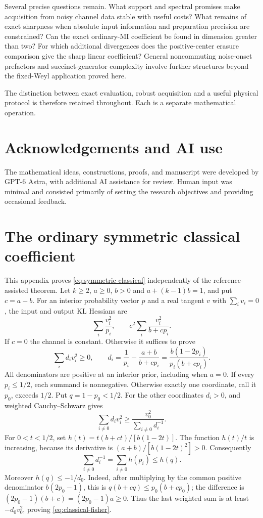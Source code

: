 \documentclass[11pt]{article}
\numberwithin{equation}{section}
\theoremstyle{definition}
\theoremstyle{remark}
\begin{document}
Several precise questions remain. What support and spectral promises
make acquisition from noisy channel data stable with useful costs?
What remains of exact sharpness when absolute input information and
preparation precision are constrained? Can the exact ordinary-MI
coefficient be found in dimension greater than two? For which additional
divergences does the positive-center erasure comparison give the sharp
linear coefficient? General noncommuting noise-onset prefactors and
succinct-generator complexity involve further structures beyond the
fixed-Weyl application proved here.

The distinction between exact evaluation, robust acquisition and a useful
physical protocol is therefore retained throughout. Each is a separate
mathematical operation.

\section*{Acknowledgements and AI use}
The mathematical ideas, constructions, proofs, and manuscript were developed by
GPT-6 Astra, with additional AI assistance for review. Human input was minimal and
consisted primarily of setting the research objectives and providing occasional
feedback.
\appendix
\section{The ordinary symmetric classical coefficient}
\label{app:classical}

This appendix proves \eqref{eq:symmetric-classical} independently of
the reference-assisted theorem. Let $k\geq2$, $a\geq0$, $b>0$ and
$a+(k-1)b=1$, and put $c=a-b$. For an interior probability vector
$p$ and a real tangent $v$ with $\sum_i v_i=0$, the input and output
KL Hessians are
\[
 \sum_i\frac{v_i^2}{p_i},\qquad
 c^2\sum_i\frac{v_i^2}{b+cp_i}.
\]
If $c=0$ the channel is constant. Otherwise it suffices to prove
\begin{equation}
 \sum_i d_i v_i^2\geq0,\qquad
 d_i=\frac1{p_i}-\frac{a+b}{b+cp_i}
     =\frac{b(1-2p_i)}{p_i(b+cp_i)}.
 \label{eq:classical-fisher}
\end{equation}
All denominators are positive at an interior prior, including when $a=0$.
If every $p_i\leq1/2$, each summand is nonnegative.
Otherwise exactly one coordinate, call it $p_0$, exceeds $1/2$.
Put $q=1-p_0<1/2$. For the other coordinates $d_i>0$, and weighted
Cauchy--Schwarz gives
\[
 \sum_{i\ne0}d_i v_i^2
 \geq \frac{v_0^2}{\sum_{i\ne0}d_i^{-1}} .
\]
For $0<t<1/2$, set
$h(t)=t(b+ct)/[b(1-2t)]$.
The function $h(t)/t$ is increasing, because its derivative is
$(a+b)/[b(1-2t)^2]>0$.
Consequently
\[
 \sum_{i\ne0}d_i^{-1}=\sum_{i\ne0}h(p_i)\leq h(q).
\]
Moreover $h(q)\leq-1/d_0$. Indeed, after multiplying by the common
positive denominator $b(2p_0-1)$, this is
$q(b+cq)\leq p_0(b+cp_0)$; the difference is
$(2p_0-1)(b+c)=(2p_0-1)a\geq0$.
Thus the last weighted sum is at least $-d_0v_0^2$,
proving \eqref{eq:classical-fisher}.
\end{document}
